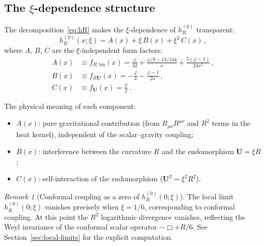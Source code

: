 \documentclass[11pt,a4paper]{article}
\newcommand{\Ricsq}{R_{\mu\nu}R^{\mu\nu}}
\theoremstyle{definition}
\theoremstyle{remark}
\newtheorem{remark}[theorem]{Remark}
\begin{document}
\subsection{The $\xi$-dependence structure}
\label{sec:xi-structure}

The decomposition~\eqref{eq:hR} makes the $\xi$-dependence
of $h_R^{(0)}$ transparent:
\begin{equation}
  h_R^{(0)}(x;\xi) = A(x) + \xi\,B(x) + \xi^2\,C(x)\,,
  \label{eq:hR-ABC}
\end{equation}
where $A$, $B$, $C$ are the $\xi$-independent form factors:
\begin{align}
  A(x) &\equiv f_{R,\text{bis}}(x)
  = \frac{\varphi}{32}
  + \frac{\varphi/8 - 13/144}{x}
  + \frac{5(\varphi-1)}{24x^2}\,,
  \label{eq:Ax}\\[4pt]
  B(x) &\equiv f_{R\mathbf{U}}(x)
  = -\frac{\varphi}{4} - \frac{\varphi-1}{2x}\,,
  \label{eq:Bx}\\[4pt]
  C(x) &\equiv f_{\mathbf{U}}(x) = \frac{\varphi}{2}\,.
  \label{eq:Cx}
\end{align}

The physical meaning of each component:
\begin{itemize}[nosep]
\item $A(x)$: pure gravitational contribution (from $\Ricsq$ and
  $R^2$ terms in the heat kernel), independent of the scalar--gravity
  coupling;
\item $B(x)$: interference between the curvature $R$ and the
  endomorphism $\mathbf{U} = \xi R$;
\item $C(x)$: self-interaction of the endomorphism
  ($\mathbf{U}^2 = \xi^2 R^2$).
\end{itemize}

\begin{remark}[Conformal coupling as a zero of $h_R^{(0)}(0;\xi)$]
The local limit $h_R^{(0)}(0;\xi)$ vanishes precisely when
$\xi = 1/6$, corresponding to conformal coupling.  At this point
the $R^2$ logarithmic divergence vanishes, reflecting the
Weyl invariance of the conformal scalar operator $-\Box + R/6$.
See Section~\ref{sec:local-limits} for the explicit computation.
\end{remark}
\end{document}
